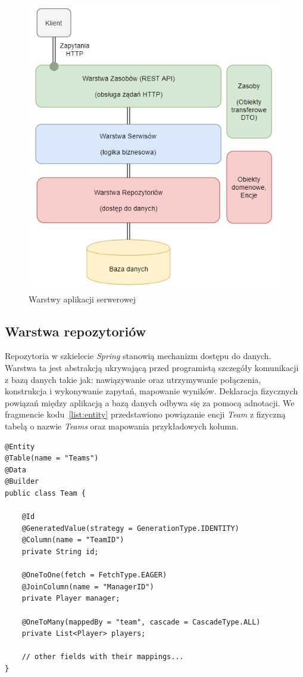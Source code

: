 \begin{figure}[H]
\centering
\includegraphics[width=0.5\linewidth]{06-implementacja/rys/layers.PNG}
\caption{Warstwy aplikacji serwerowej}
\label{fig:app-layers}
\end{figure}


\subsection{Warstwa repozytoriów}

Repozytoria w szkielecie \textit{Spring} stanowią mechanizm dostępu do danych. Warstwa ta jest abstrakcją ukrywającą przed programistą szczegóły komunikacji z bazą danych takie jak: nawiązywanie oraz utrzymywanie połączenia, konstrukcja i wykonywanie zapytań, mapowanie wyników. Deklaracja fizycznych powiązań między aplikacją a bazą danych odbywa się za pomocą adnotacji. We fragmencie kodu~\ref{list:entity} przedstawiono powiązanie encji \textit{Team} z fizyczną tabelą o nazwie \textit{Teams} oraz mapowania przykładowych kolumn.

\renewcommand{\lstlistingname}{Fragment kodu}
\begin{lstlisting}[label=list:entity, caption=Fragment deklaracji klasy encyjnej Team, basicstyle=\footnotesize\ttfamily]
@Entity
@Table(name = "Teams")
@Data
@Builder
public class Team {

    @Id
    @GeneratedValue(strategy = GenerationType.IDENTITY)
    @Column(name = "TeamID")
    private String id;

    @OneToOne(fetch = FetchType.EAGER)
    @JoinColumn(name = "ManagerID")
    private Player manager;

    @OneToMany(mappedBy = "team", cascade = CascadeType.ALL)
    private List<Player> players;
    
    // other fields with their mappings...
}
\end{lstlisting}

